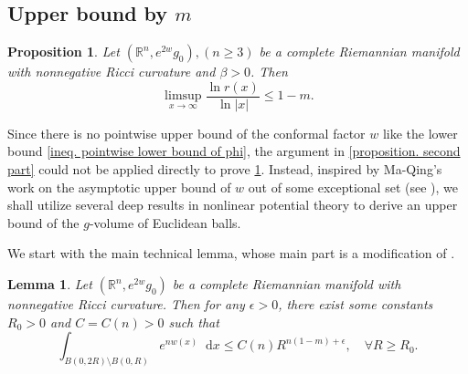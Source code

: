 \documentclass[12pt]{amsart}
\theoremstyle{plain}
\newtheorem{proposition}[theorem]{Proposition}
\newtheorem{lemma}[theorem]{Lemma}
\theoremstyle{definition}
\theoremstyle{remark}     %
\numberwithin{equation}{section}
\newcommand{\dx}{\mathop{}\!\mathrm{d}x}
\begin{document}
\subsection{Upper bound by $m$ }
\begin{proposition}\label{proposition. third part}
    Let $(\mathbb{R}^n,e^{2w}g_0), (n\geq 3)$ be a complete Riemannian manifold with nonnegative Ricci curvature and $\beta>0$.
    Then 
    \[
        \limsup_{x\to \infty}\frac{\ln r(x)}{\ln |x|}\leq 1-m.
    \]
\end{proposition}

Since there is no pointwise upper bound of the conformal factor $w$ like the lower bound \cref{ineq. pointwise lower bound of phi}, the argument in \cref{proposition. second part} could not be applied directly to  prove \cref{proposition. third part}.
Instead, inspired by Ma-Qing's work on the asymptotic upper bound of $w$ out of some exceptional set (see \cite[Theorem 3.1]{MQ}), we shall utilize several deep results in nonlinear potential theory to derive an upper bound of the $g$-volume of Euclidean balls.

We start with the main technical lemma, whose main part is a modification of \cite[proposition 4.1]{MQ}.

\begin{lemma}\label{lemma. integral of exp(n phi)}
    Let $(\mathbb{R}^n,e^{2w}g_0)$ be a complete Riemannian manifold with nonnegative Ricci curvature.
    Then for any $\epsilon>0$, there exist some constants $R_0>0$ and $C=C(n)>0$ such that
    \[
        \int_{B(0,2R)\setminus B(0,R)} e^{nw(x)}\dx 
        \leq C(n)R^{n(1-m)+\epsilon},\quad \forall R\geq R_0.
    \]
\end{lemma}
\end{document}
